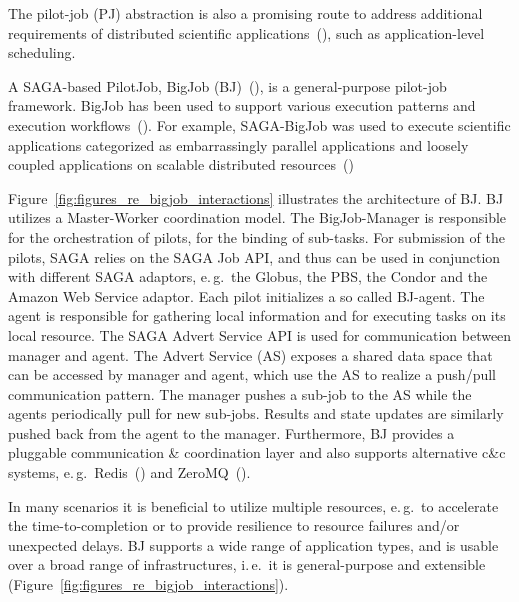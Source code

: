 \documentclass{sig-alternate}
\begin{document}
The pilot-job (PJ) abstraction is also a promising route to address
additional requirements of distributed scientific
applications~(\cite{ko-efficient,bigjob_cloudcom10}), such as
application-level scheduling.  

A SAGA-based PilotJob, BigJob (BJ)~(\cite{bigjob_web,saga_bigjob_condor_cloud}),
is a general-purpose pilot-job framework. BigJob has been used to support
various execution patterns and execution
workflows~(\cite{async_repex11,repex_ptrsa}). For example, SAGA-BigJob was used
to execute scientific applications categorized as embarrassingly parallel
applications and loosely coupled applications on scalable distributed
resources~(\cite{ecmls_ccpe10, dare-ecmls11})

Figure~\ref{fig:figures_re_bigjob_interactions} illustrates the
architecture of BJ. BJ utilizes a Master-Worker coordination
model. The BigJob-Manager is responsible for the orchestration of
pilots, for the binding of sub-tasks. For submission of the pilots,
SAGA relies on the SAGA Job API, and thus can be used in conjunction
with different SAGA adaptors, e.\,g.\ the Globus, the PBS, the Condor
and the Amazon Web Service adaptor. Each pilot initializes a so called
BJ-agent. The agent is responsible for gathering local information and
for executing tasks on its local resource. The SAGA Advert Service API
is used for communication between manager and agent. The Advert
Service (AS) exposes a shared data space that can be accessed by
manager and agent, which use the AS to realize a push/pull
communication pattern.  The manager pushes a sub-job to the AS while
the agents periodically pull for new sub-jobs. Results and state
updates are similarly pushed back from the agent to the
manager. Furthermore, BJ provides a pluggable communication \&
coordination layer and also supports alternative c\&c systems,
e.\,g.\ Redis~(\cite{redis}) and ZeroMQ~(\cite{zmq}).

In many scenarios it is beneficial to utilize multiple resources,
e.\,g.\ to accelerate the time-to-completion or to provide resilience
to resource failures and/or unexpected delays.  BJ supports a wide
range of application types, and is usable over a broad range of
infrastructures, i.\,e.\ it is general-purpose and extensible
(Figure~\ref{fig:figures_re_bigjob_interactions}). 
\end{document}
